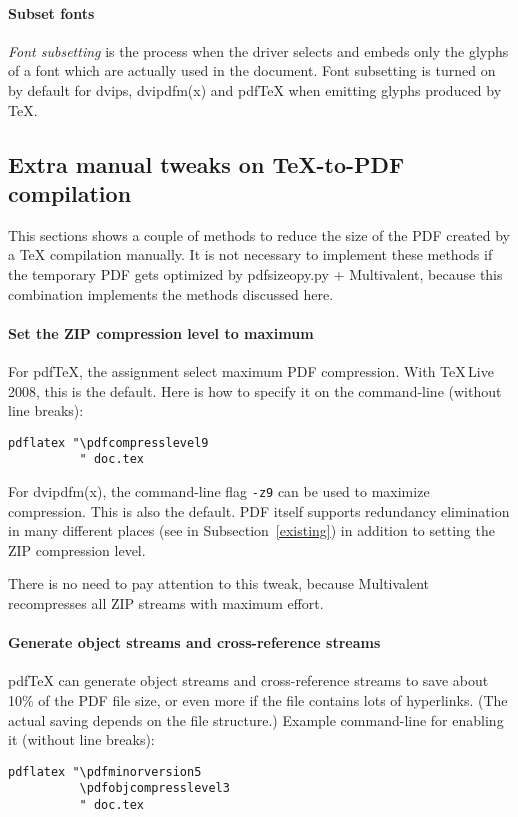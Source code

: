 \documentclass{ltugproc}
\def\cmd{\textsf}
\begin{document}
\paragraph{Subset fonts}

\emph{Font subsetting} is the process when the driver selects and embeds
only the glyphs of a font which are actually used in the document. Font
subsetting is turned on by default for \cmd{dvips}, \cmd{dvipdfm(x)} and
pdf\TeX{} when emitting glyphs produced by \TeX{}.


\subsection{Extra manual tweaks on \TeX{}-to-PDF compilation}

This sections shows a couple of methods to reduce the size of the PDF created
by a \TeX{} compilation manually. It is not necessary to implement these
methods if the temporary PDF gets optimized by \cmd{pdfsizeopy.py}
$+$ Multivalent, because this combination implements the methods discussed
here.

\paragraph{Set the ZIP compression level to maximum}

For pdf\TeX{}, the assignment \texttt{\string{}} select
maximum PDF compression. With \TeX{}\,Live 2008, this is the default. Here
is how to specify it on the command-line (without line breaks):
\begin{verbatim}
pdflatex "\pdfcompresslevel9
          " doc.tex
\end{verbatim}\noindent
For \cmd{dvipdfm(x)}, the command-line flag \texttt{-z9} can be used to
maximize compression. This is also the default.
PDF itself supports redundancy elimination in many different
places (see in Subsection~\ref{existing}) in addition to
setting the ZIP compression level.

There is no need to pay attention to this tweak, because
Multivalent recompresses all ZIP streams with maximum effort.

\paragraph{Generate object streams and cross-reference streams}

pdf\TeX{} can generate object streams and cross-reference streams to save
about 10\% of the PDF file size, or even more if the file contains lots of
hyperlinks. (The actual saving depends on the file
structure.) Example command-line for enabling it (without line breaks):
\begin{verbatim}
pdflatex "\pdfminorversion5
          \pdfobjcompresslevel3
          " doc.tex
\end{verbatim}
\end{document}
